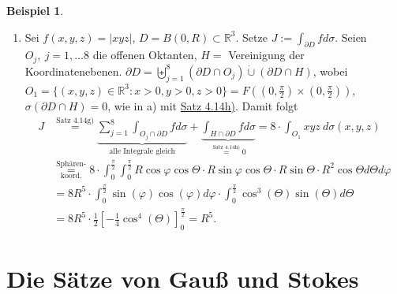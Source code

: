 \documentclass[a4paper]{report}
\newcommand{\R}{\mathbb{R}}
\newcommand{\dcup}{\dot{\cup}}
\newcommand{\bigdcup}{\biguplus}
\newcommand{\overunderset}[3]{\overset{#1}{\underset{#3}{#2}}}
\newcommand{\jlabel}[1]{\label{j_#1}}
\newcommand{\jshortlink}[1]{\jhyperref{#1}{\text{#1}}}
\newcommand{\jhyperref}[2]{\hyperref[j_#1]{#2}}
\newcommand{\jlink}[1]{\jhyperref{#1}{#1}}
\theoremstyle{plain}
\theoremstyle{definition}
\newtheorem{expl}[thm]{Beispiel}
\begin{document}
{{{{\begin{expl}
\begin{enumerate}
        \item
            \jlabel{Bsp 4.15b)}
            Sei $f(x,y,z) = |xyz|$, $D=B(0,R)\subset \R^3$. Setze $J:=\int_{\partial D} f d\sigma$. Seien $O_j,\ j=1,\dots 8$ die offenen Oktanten, $H =$ Vereinigung der Koordinatenebenen. $\partial D = \bigdcup_{j=1}^8 (\partial D \cap O_j) \dcup (\partial D \cap H)$, wobei $O_1 = \{(x,y,z)\in \R^3 : x>0, y>0, z>0\} = F\left( (0, \frac{\pi}{2}) \times (0,\frac{\pi}{2}) \right)$, $\sigma(\partial D \cap H) = 0$, wie in a) mit \jlink{Satz 4.14h)}. Damit folgt
            \[
                \begin{split}
                    J &\overset{\jshortlink{Satz 4.14g)}}{=} \underbrace{\sum_{j=1}^8 \int_{O_j\cap \partial D} f d\sigma}_{\text{alle Integrale gleich}} + \underbrace{\int_{H \cap \partial D} f d\sigma}_{\overset{\jshortlink{Satz 4.14h)}}{=} 0} = 8\cdot \int_{O_1} xyz \ d\sigma(x,y,z)\\
                    &\overunderset{\text{Sphären-}}{=}{\text{koord.}} 8\cdot \int_0^\frac{\pi}{2} \int_0^\frac{\pi}{2} R \cos\varphi \cos\Theta \cdot R \sin\varphi \cos\Theta \cdot R \sin\Theta \cdot R^2 \cos\Theta d\Theta d\varphi\\
                    &= 8 R^5 \cdot \int_0^\frac{\pi}{2} \sin(\varphi)\cos(\varphi)d\varphi \cdot \int_0^\frac{\pi}{2}\cos^3(\Theta)\sin(\Theta)d\Theta\\
                    &= 8 R^5\cdot \frac{1}{2} \left[-\frac{1}{4} \cos^4(\Theta) \right]_0^\frac{\pi}{2} = R^5.
                \end{split}
            \]
    \end{enumerate}
\end{expl}
        
\section{Die Sätze von Gauß und Stokes}

}}}}
\end{document}
